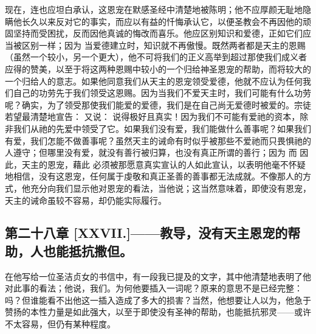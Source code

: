 现在，连也应坦白承认，这恩宠在默感圣经中清楚地被陈明；他不应厚颜无耻地隐瞒他长久以来反对它的事实，而应以有益的忏悔承认它，以便圣教会不再因他的顽固坚持而受困扰，反而因他真诚的悔改而喜乐。他应区别知识和爱德，正如它们应当被区别一样；因为 当爱德建立时，知识就不再傲慢。既然两者都是天主的恩赐（虽然一个较小，另一个更大），他不可将我们的正义高举到超过那使我们成义者应得的赞美，以至于将这两种恩赐中较小的一个归给神圣恩宠的帮助，而将较大的一个归给人的意志。如果他同意我们从天主的恩宠领受爱德，他就不应认为任何我们自己的功劳先于我们领受这恩赐。因为当我们不爱天主时，我们可能有什么功劳呢？确实，为了领受那使我们能爱的爱德，我们是在自己尚无爱德时被爱的。宗徒若望最清楚地宣告：  又说： 说得极好且真实！因为我们不可能有爱祂的资本，除非我们从祂的先爱中领受了它。如果我们没有爱，我们能做什么善事呢？如果我们有爱，我们怎能不做善事呢？虽然天主的诫命有时似乎被那些不爱祂而只畏惧祂的人遵守；但哪里没有爱，就没有善行被归算，也没有真正所谓的善行；因为  而 因此，天主的恩宠，藉此  必须被那愿意真实宣认的人如此宣认，以表明他毫不怀疑地相信，没有这恩宠，任何属于虔敬和真正圣善的善事都无法成就。不像那人的方式，他充分向我们显示他对恩宠的看法，当他说；这当然意味着，即使没有恩宠，天主的诫命虽较不容易，却仍能实际履行。\par


\subsection{第二十八章 [XXVII.]——教导，没有天主恩宠的帮助，人也能抵抗撒但。}

在他写给一位圣洁贞女的书信中，有一段我已提及的文字，其中他清楚地表明了他对此事的看法；他说，我们。为何他要插入一词呢？原来的意思不是已经完整：吗？但谁能看不出他这一插入造成了多大的损害？当然，他想要让人以为，他急于赞扬的本性力量是如此强大，以至于即使没有圣神的帮助，也能抵抗邪灵——或许不太容易，但仍有某种程度。\par

